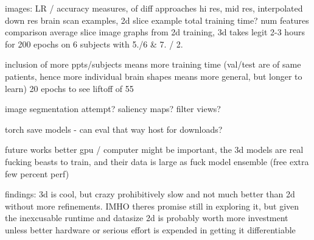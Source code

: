 \documentclass[10pt,twocolumn,letterpaper]{article}
\begin{document}
images:
LR / accuracy measures, of diff approaches
hi res, mid res, interpolated down res brain scan examples,
2d slice example
total training time? num features comparison
average slice image
graphs from 2d training, 3d takes legit 2-3 hours for 200 epochs on 6 subjects with 5./6 & 7. / 2.

inclusion of more ppts/subjects means more training time (val/test are of same patients,
hence more individual brain shapes means more general, but longer to learn)
20 epochs to see liftoff of 55%

image segmentation attempt?
saliency maps?
filter views?

torch save models - can eval that way
host for downloads?

future works
better gpu / computer might be important, the 3d models are real fucking beasts to train, and their data is large as fuck
model ensemble (free extra few percent perf)

findings: 3d is cool, but crazy prohibitively slow and not much better than 2d without more refinements. IMHO theres
promise still in exploring it, but given the inexcusable runtime and datasize 2d is probably worth more investment
unless better hardware or serious effort is expended in getting it differentiable

{\small


}
\end{document}
